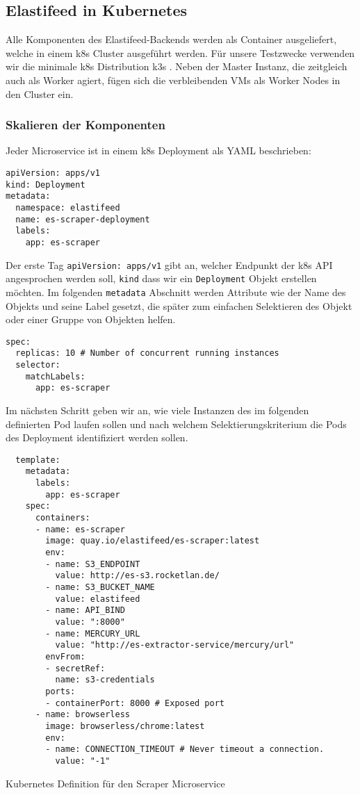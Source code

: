 \subsection{Elastifeed in Kubernetes}

Alle Komponenten des Elastifeed-Backends werden als Container ausgeliefert, welche in einem \ac{k8s} Cluster ausgeführt werden.
Für unsere Testzwecke verwenden wir die minimale \ac{k8s} Distribution k3s \cite{k3s}.
Neben der Master Instanz, die zeitgleich auch als Worker agiert, fügen sich die verbleibenden VMs als Worker Nodes in den Cluster ein.

\subsubsection{Skalieren der Komponenten}

Jeder Microservice ist in einem \ac{k8s} Deployment als YAML beschrieben:
\begin{verbatim}
apiVersion: apps/v1
kind: Deployment
metadata:
  namespace: elastifeed
  name: es-scraper-deployment
  labels:
    app: es-scraper
\end{verbatim}
Der erste Tag \texttt{apiVersion: apps/v1} gibt an, welcher Endpunkt der \ac{k8s} API angesprochen werden soll, \texttt{kind} dass wir ein \texttt{Deployment} Objekt erstellen möchten.
Im folgenden \texttt{metadata} Abschnitt werden Attribute wie der Name des Objekts und seine Label gesetzt, die später zum einfachen Selektieren des Objekt oder einer Gruppe von Objekten helfen.

\begin{verbatim}
spec:
  replicas: 10 # Number of concurrent running instances
  selector:
    matchLabels:
      app: es-scraper
\end{verbatim}

Im nächsten Schritt geben wir an, wie viele Instanzen des im folgenden definierten Pod laufen sollen und nach welchem Selektierungskriterium die Pods des Deployment identifiziert werden sollen.

\begin{listing}[h]
\begin{verbatim}
  template:
    metadata:
      labels:
        app: es-scraper
    spec:
      containers:
      - name: es-scraper
        image: quay.io/elastifeed/es-scraper:latest
        env:
        - name: S3_ENDPOINT
          value: http://es-s3.rocketlan.de/
        - name: S3_BUCKET_NAME
          value: elastifeed
        - name: API_BIND
          value: ":8000"
        - name: MERCURY_URL
          value: "http://es-extractor-service/mercury/url"
        envFrom:
        - secretRef:
          name: s3-credentials
        ports:
        - containerPort: 8000 # Exposed port
      - name: browserless
        image: browserless/chrome:latest
        env:
        - name: CONNECTION_TIMEOUT # Never timeout a connection.
          value: "-1"
\end{verbatim}
\caption{Kubernetes Definition für den Scraper Microservice}
\label{deployment:code:scraper}
\end{listing}

